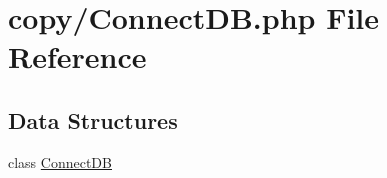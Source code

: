\hypertarget{copy_2_connect_d_b_8php}{}\section{copy/\+Connect\+D\+B.php File Reference}
\label{copy_2_connect_d_b_8php}
\subsection*{Data Structures}
\begin{DoxyCompactItemize}
\item 
class \hyperlink{class_connect_d_b}{Connect\+D\+B}
\end{DoxyCompactItemize}
